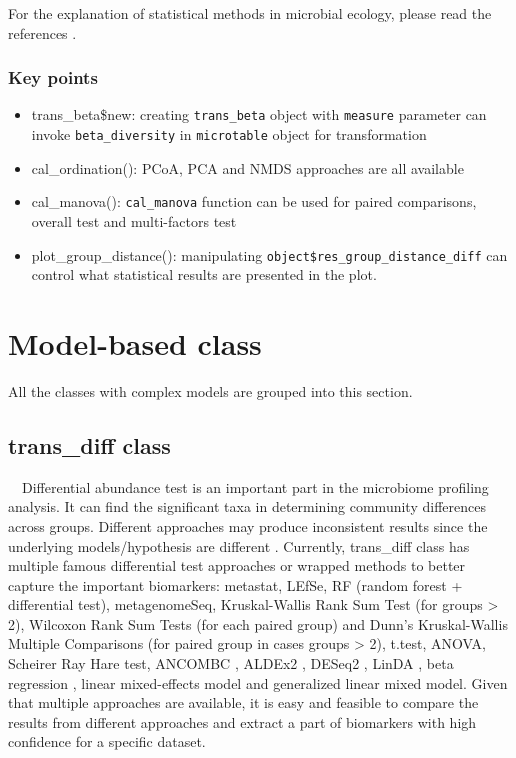 \documentclass[
]{book}
\providecommand{\tightlist}{%
  \setlength{\itemsep}{0pt}\setlength{\parskip}{0pt}}
\begin{document}
For the explanation of statistical methods in microbial ecology, please read the references \citep{Ramette_Multivariate_2007, Buttigieg_guide_2014}.

\hypertarget{key-points-4}{%
\subsection{Key points}\label{key-points-4}}

\begin{itemize}
\tightlist
\item
  trans\_beta\$new: creating \texttt{trans\_beta} object with \texttt{measure} parameter can invoke \texttt{beta\_diversity} in \texttt{microtable} object for transformation
\item
  cal\_ordination(): PCoA, PCA and NMDS approaches are all available
\item
  cal\_manova(): \texttt{cal\_manova} function can be used for paired comparisons, overall test and multi-factors test
\item
  plot\_group\_distance(): manipulating \texttt{object\$res\_group\_distance\_diff} can control what statistical results are presented in the plot.
\end{itemize}

\hypertarget{model-based-class}{%
\chapter{Model-based class}\label{model-based-class}}

All the classes with complex models are grouped into this section.

\hypertarget{trans_diff-class}{%
\section{trans\_diff class}\label{trans_diff-class}}

　Differential abundance test is an important part in the microbiome profiling analysis.
It can find the significant taxa in determining community differences across groups.
Different approaches may produce inconsistent results since the underlying models/hypothesis are different \citep{Nearing_Microbiome_2022}.
Currently, trans\_diff class has multiple famous differential test approaches or wrapped methods to better capture the important biomarkers:
metastat\citep{White_Statistical_2009}, LEfSe\citep{Segata_Metagenomic_2011}, RF (random forest + differential test), metagenomeSeq\citep{Paulson_Differential_2013},
Kruskal-Wallis Rank Sum Test (for groups \textgreater{} 2), Wilcoxon Rank Sum Tests (for each paired group) and
Dunn's Kruskal-Wallis Multiple Comparisons (for paired group in cases groups \textgreater{} 2),
t.test, ANOVA, Scheirer Ray Hare test,
ANCOMBC \citep{Lin_Analysis_2020}, ALDEx2 \citep{Fernandes_Unifying_2014},
DESeq2 \citep{Michael_Moderated_2014}, LinDA \citep{LinDA_Zhou_2022}, beta regression \citep{Betaregression_2010},
linear mixed-effects model and generalized linear mixed model.
Given that multiple approaches are available,
it is easy and feasible to compare the results from different approaches and extract a part of biomarkers with high confidence for a specific dataset.
\end{document}

